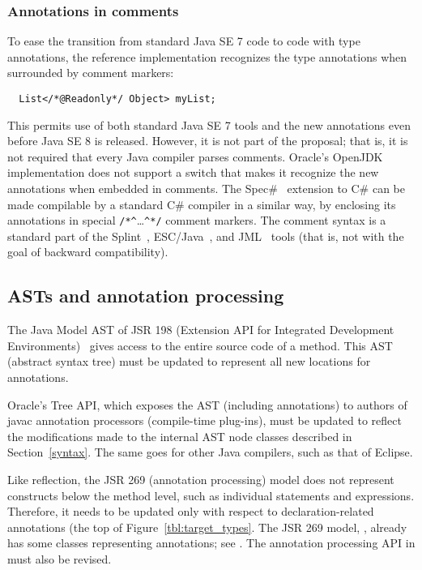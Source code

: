 \documentclass[10pt]{article}
\begin{document}
\subsubsection{Annotations in comments\label{annotations-in-comments}}

To ease the transition from standard Java SE 7 code to code with type
annotations, the reference implementation recognizes the type
annotations when surrounded by comment markers:

\preverbnegspace
\begin{Verbatim}
  List</*@Readonly*/ Object> myList;
\end{Verbatim}

\noindent
This permits use of both standard Java SE 7 tools and the new annotations even
before Java SE 8 is released.  However, it is not part of the proposal;
that is, it is not required that every Java compiler parses comments.
Oracle's OpenJDK implementation does not support a switch that
makes it recognize the new annotations when embedded in comments.
The Spec\#~\cite{BarnettLS2004} extension to C\# can be made compilable by
a standard C\# compiler in a similar way, by enclosing its annotations in
special \verb|/*^|\ldots\verb|^*/| comment markers.
The  comment syntax is a standard part of the
Splint~\cite{Evans96}, ESC/Java~\cite{FlanaganLLNSS02}, and
JML~\cite{LeavensBR2006:JML} tools (that is, not
with the goal of backward compatibility).



\subsection{ASTs and annotation processing\label{asts-and-annotation-processing}}

The Java Model AST of JSR 198 (Extension API for Integrated Development
Environments)~\cite{JSR198} gives access to the entire source code of a
method.  This AST (abstract syntax tree) must be updated to represent all
new locations for annotations.

Oracle's Tree API, which exposes the AST (including annotations) to authors of
javac annotation processors (compile-time plug-ins), must be updated to
reflect the modifications made to the internal AST node classes described in
Section~\ref{syntax}.
The same goes for other Java compilers, such as that of Eclipse.


\label{jsr269-changes}

Like reflection, the JSR 269 (annotation processing) model
does not represent constructs below the
method level, such as individual statements and expressions.  Therefore, it
needs to be updated only with respect to declaration-related annotations
(the top of Figure~\ref{tbl:target_types}.
The JSR 269 model, ,
already has some classes representing annotations; see
.
The annotation processing API in  must
also be revised.
\end{document}
